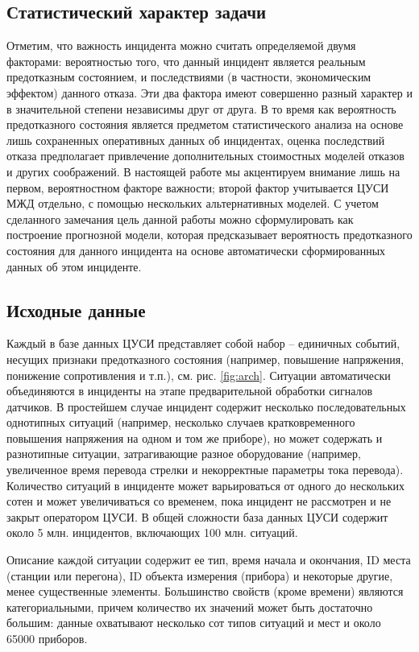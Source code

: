 \subsection{Статистический характер задачи}\label{sec:stat}
Отметим, что важность инцидента можно считать определяемой двумя факторами: вероятностью того, что данный инцидент является реальным предотказным состоянием, и последствиями (в частности, экономическим эффектом) данного отказа. Эти два фактора имеют совершенно разный характер и в значительной степени независимы друг от друга. В то время как вероятность предотказного состояния является предметом статистического анализа на основе лишь сохраненных оперативных данных об инцидентах, оценка последствий отказа предполагает привлечение дополнительных стоимостных моделей отказов и других соображений. В настоящей работе мы акцентируем внимание лишь на первом, вероятностном факторе важности; второй фактор учитывается ЦУСИ МЖД отдельно, с помощью нескольких альтернативных моделей.  
С учетом сделанного замечания цель данной работы можно сформулировать как построение прогнозной модели, которая предсказывает вероятность предотказного состояния для данного инцидента на основе автоматически сформированных данных об этом инциденте.


\subsection{Исходные данные}
Каждый  в базе данных ЦУСИ представляет собой набор  -- единичных событий, несущих признаки предотказного состояния (например, повышение напряжения, понижение сопротивления и т.п.), см. рис. \ref{fig:arch}. Ситуации автоматически объединяются в инциденты на этапе предварительной обработки сигналов датчиков. В простейшем случае инцидент содержит несколько последовательных однотипных ситуаций (например, несколько случаев кратковременного повышения напряжения на одном и том же приборе), но может содержать и разнотипные ситуации, затрагивающие разное оборудование (например, увеличенное время перевода стрелки и некорректные параметры тока перевода). Количество ситуаций в инциденте может варьироваться от одного до нескольких сотен и может увеличиваться со временем, пока инцидент не рассмотрен и не закрыт оператором ЦУСИ. В общей сложности база данных ЦУСИ содержит около 5 млн. инцидентов, включающих 100 млн. ситуаций.  

Описание каждой ситуации содержит ее тип, время начала и окончания, 
ID места (станции или перегона), ID объекта измерения (прибора) и некоторые другие, менее существенные элементы. Большинство свойств (кроме времени) являются категориальными, причем количество их значений может быть достаточно большим: данные охватывают несколько сот типов ситуаций и мест и около 65000 приборов.

